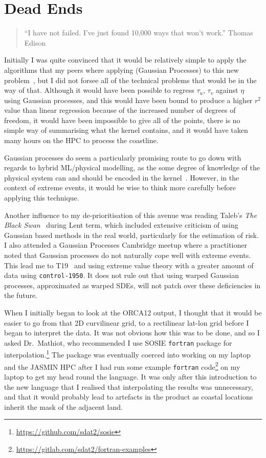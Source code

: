 
\section{Dead Ends}

\begin{quote}
``I have not failed. I've just found 10,000 ways that won't work.''
Thomas Edison
\end{quote}

Initially I was quite convinced that it would be relatively
simple to apply the algorithms that my peers where applying
(Gaussian Processes) to this new problem~\cite{LeMaitre2019gaussian}, but I did not
forsee all of the technical problems that would be in the way of that.
Although it would have been possible to regress $\tau_u$, $\tau_v$ against
$\eta$ using Gaussian processes, and this would have been bound to produce a
higher $r^2$ value than linear regression because of the increased number of
degrees of freedom, it would have been impossible to give all of the points,
there is no simple way of summarising what the kernel contains,
and it would have taken many hours on the HPC to process the coastline.

Gaussian processes do seem a particularly promising route to go down
with regards to hybrid ML/physical modelling, as the some degree of knowledge
of the physical system can and should be encoded in the kernel~\cite{duvenaud2014automatic}.
However, in the context of extreme events, it would be wise to think more carefully
before applying this technique.

Another influence to  my de-prioritisation of this
avenue was reading Taleb's \textit{The Black Swan}~\cite{taleb2007black} during Lent
term, which included extensive criticism of using Gaussian based methods in the
real world, particularly for the estimation of risk.
I also attended a Gaussian Processes Cambridge meetup where a practitioner noted that
Gaussian processes do not naturally cope well with extreme
events. This lead me to T19~\cite{taleb2019statistical} and using extreme value
theory with a greater amount of data using \texttt{control-1950}.
It does not rule out that using warped Gaussian processes, approximated as
warped SDEs, will not patch over these deficiencies in the future.

When I initially began to look at the ORCA12 output,
I thought that it would be easier to go from that 2D
curvilinear grid, to a rectilinear lat-lon grid before
I began to interpret the data. It was not obvious how
this was to be done, and so I asked Dr.~Mathiot, who recommended
I use SOSIE \texttt{fortran} package for interpolation.\footnote{\url{https://github.com/sdat2/sosie}}
The package was eventually coerced into working on my laptop and the JASMIN
HPC after I had run some example \texttt{fortran}
code\footnote{\url{https://gitlab.com/sdat2/fortran-examples}} on my laptop
to get my head round the language. It was only after this introduction to
the new language that I realised that interpolating the results was
unnecessary, and that it would probably lead to artefacts in the product as coastal
locations inherit the mask of the adjacent land.

